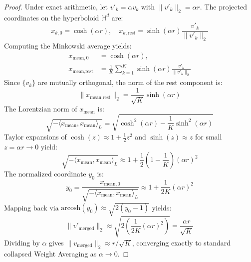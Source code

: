 \documentclass{article}
\theoremstyle{plain}
\theoremstyle{definition}
\theoremstyle{remark}
\begin{document}
\begin{proof}
Under exact arithmetic, let $v'_k = \alpha v_k$ with $\|v'_k\|_2 = \alpha r$. The projected coordinates on the hyperboloid $\mathbb{H}^d$ are:
\begin{equation}
x_{k, 0} = \cosh(\alpha r), \quad x_{k, \text{rest}} = \sinh(\alpha r) \frac{v'_k}{\|v'_k\|_2}
\end{equation}
Computing the Minkowski average yields:
\begin{align}
x_{\text{mean}, 0} &= \cosh(\alpha r), \nonumber \\
x_{\text{mean}, \text{rest}} &= \frac{1}{K} \sum_{k=1}^K \sinh(\alpha r) \frac{v'_k}{\|v'_k\|_2}
\end{align}
Since $\{v_k\}$ are mutually orthogonal, the norm of the rest component is:
\begin{equation}
\|x_{\text{mean}, \text{rest}}\|_2 = \frac{1}{\sqrt{K}} \sinh(\alpha r)
\end{equation}
The Lorentzian norm of $x_{\text{mean}}$ is:
\begin{equation}
\sqrt{-\langle x_{\text{mean}}, x_{\text{mean}} \rangle_L} = \sqrt{\cosh^2(\alpha r) - \frac{1}{K} \sinh^2(\alpha r)}
\end{equation}
Taylor expansions of $\cosh(z) \approx 1 + \frac{1}{2}z^2$ and $\sinh(z) \approx z$ for small $z = \alpha r \to 0$ yield:
\begin{equation}
\sqrt{-\langle x_{\text{mean}}, x_{\text{mean}} \rangle_L} \approx 1 + \frac{1}{2}\left(1 - \frac{1}{K}\right) (\alpha r)^2
\end{equation}
The normalized coordinate $y_0$ is:
\begin{equation}
y_0 = \frac{x_{\text{mean}, 0}}{\sqrt{-\langle x_{\text{mean}}, x_{\text{mean}} \rangle_L}} \approx 1 + \frac{1}{2K} (\alpha r)^2
\end{equation}
Mapping back via $\text{arcosh}(y_0) \approx \sqrt{2(y_0 - 1)}$ yields:
\begin{equation}
\|v'_{\text{merged}}\|_2 \approx \sqrt{2 \left(\frac{1}{2K} (\alpha r)^2\right)} = \frac{\alpha r}{\sqrt{K}}
\end{equation}
Dividing by $\alpha$ gives $\|v_{\text{merged}}\|_2 \approx r / \sqrt{K}$, converging exactly to standard collapsed Weight Averaging as $\alpha \to 0$.


\end{proof}
\end{document}
